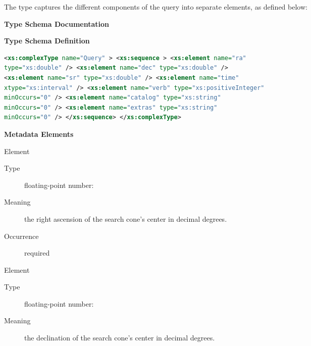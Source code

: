 \documentclass[11pt,a4paper]{ivoa} 
\begin{document}
The  type captures the different components of the query
into separate elements, as defined below:

\begin{generated} \begingroup \renewcommand*{}\vspace{2ex}\noindent\textbf{
Type Schema Documentation}


\vspace{1ex}\noindent\textbf{ Type Schema Definition}

\begin{lstlisting}[language=XML,basicstyle=\footnotesize]
<xs:complexType name="Query" > <xs:sequence > <xs:element name="ra"
type="xs:double" /> <xs:element name="dec" type="xs:double" />
<xs:element name="sr" type="xs:double" /> <xs:element name="time"
xtype="xs:interval" /> <xs:element name="verb" type="xs:positiveInteger"
minOccurs="0" /> <xs:element name="catalog" type="xs:string"
minOccurs="0" /> <xs:element name="extras" type="xs:string"
minOccurs="0" /> </xs:sequence> </xs:complexType> \end{lstlisting}

\vspace{0.5ex}\noindent\textbf{ Metadata Elements}

\begingroup\small\begin{bigdescription}\item[Element \xmlel{ra}]
\begin{description} \item[Type] floating-point number: 
\item[Meaning] the right ascension of the search cone's center in
decimal degrees.  
               
\item[Occurrence] required

\end{description} \item[Element \xmlel{dec}] \begin{description}
\item[Type] floating-point number:  \item[Meaning] the
declination of the search cone's center in decimal degrees.  
               

\end{description}
\end{bigdescription}
\end{generated}
\end{document}
